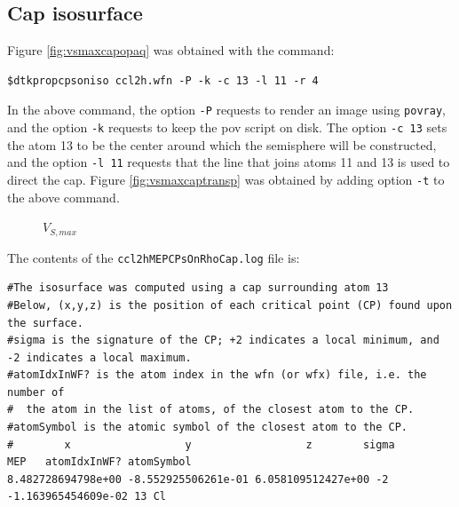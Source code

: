 \subsection{Cap isosurface}
Figure \ref{fig:vsmaxcapopaq} was obtained with the command:
\begin{lstlisting}
$dtkpropcpsoniso ccl2h.wfn -P -k -c 13 -l 11 -r 4
\end{lstlisting}
In the above command, the option \texttt{-P} requests to render an image using \texttt{povray},
and the option \texttt{-k} requests to keep the pov script on disk. The option \texttt{-c 13} sets
the atom 13 to be the center around which the semisphere will be constructed, and the option
\texttt{-l 11} requests that the line that joins atoms 11 and 13 is used to direct the cap.
Figure \ref{fig:vsmaxcaptransp} was obtained by adding option \texttt{-t} to the above command.
%
\begin{figure}[ht!]
\centering
{}
\caption{$V_{S,max}$}\label{fig:vsmaxcap}
\end{figure}
%

The contents of the \texttt{ccl2hMEPCPsOnRhoCap.log} file is:
\begin{scriptsize}
\begin{verbatim}
#The isosurface was computed using a cap surrounding atom 13
#Below, (x,y,z) is the position of each critical point (CP) found upon the surface.
#sigma is the signature of the CP; +2 indicates a local minimum, and -2 indicates a local maximum.
#atomIdxInWF? is the atom index in the wfn (or wfx) file, i.e. the number of
#  the atom in the list of atoms, of the closest atom to the CP.
#atomSymbol is the atomic symbol of the closest atom to the CP.
#        x                  y                  z        sigma       MEP   atomIdxInWF? atomSymbol
8.482728694798e+00 -8.552925506261e-01 6.058109512427e+00 -2 -1.163965454609e-02 13 Cl
\end{verbatim}
\end{scriptsize}

